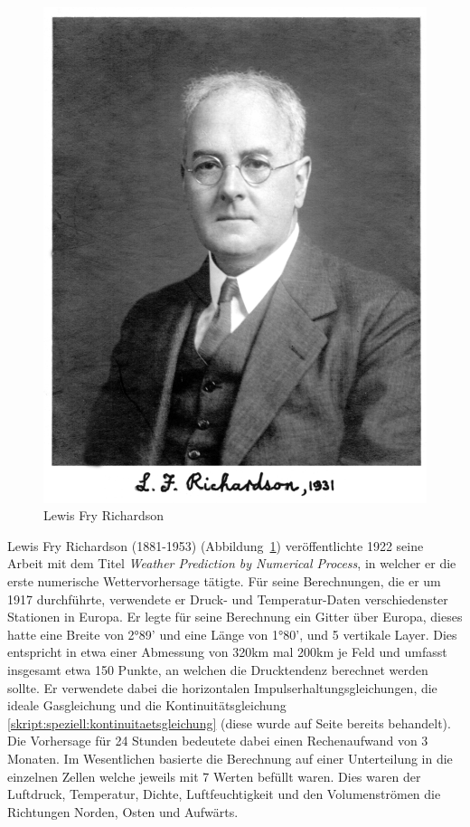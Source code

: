 \begin{refsection}
\begin{figure}
\centering
\includegraphics{klima/richardson.jpg}
\caption{Lewis Fry Richardson \cite{klima:biography}
\label{klima:geschichte:richardson}}
\end{figure}

Lewis Fry Richardson (1881-1953) (Abbildung~\ref{klima:geschichte:richardson}) veröffentlichte 1922 seine Arbeit mit dem Titel {\em Weather Prediction by Numerical Process}, in welcher er die erste numerische Wettervorhersage tätigte. Für seine Berechnungen, die er um 1917 durchführte, verwendete er Druck- und Temperatur-Daten verschiedenster Stationen in Europa. Er legte für seine Berechnung ein Gitter über Europa, dieses hatte eine Breite von 2°89' und eine Länge von 1°80', und 5 vertikale Layer. Dies entspricht in etwa einer Abmessung von 320km mal 200km je Feld und umfasst insgesamt etwa 150 Punkte, an welchen die Drucktendenz berechnet werden sollte. Er verwendete dabei die horizontalen Impulserhaltungsgleichungen, die ideale Gasgleichung und die Kontinuitätsgleichung \eqref{skript:speziell:kontinuitaetsgleichung} (diese wurde auf Seite \pageref{skript:speziell:kontinuitaetsgleichung} bereits behandelt). Die Vorhersage für 24 Stunden bedeutete dabei einen Rechenaufwand von 3 Monaten. Im Wesentlichen basierte die Berechnung auf einer Unterteilung in die einzelnen Zellen welche jeweils mit 7 Werten befüllt waren. Dies waren der Luftdruck, Temperatur, Dichte, Luftfeuchtigkeit und den Volumenströmen die Richtungen Norden, Osten und Aufwärts.


\end{refsection}
